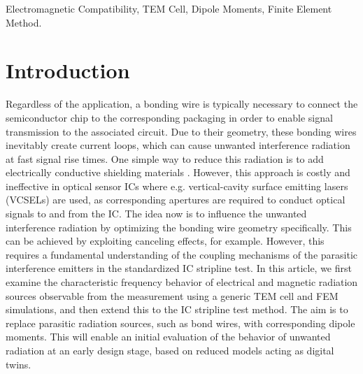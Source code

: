 \documentclass[conference]{IEEEtran}
\begin{document}
\begin{abstract}
The IC stripline test method is a standardized test method used to characterize the electromagnetic behavior of integrated circuits (ICs), particularly unwanted radiation behavior and sensitivity to external electromagnetic fields. This test method is based on the principle of TEM (transverse electromagnetic) cells. Due to the internal geometry of the IC's bond wires, parasitic electrically short electric and magnetic antennas emerge in the frequency range under consideration. In this contribution, the coupling behavior of these parasitic antennas to the IC stripline will be fundamentally investigated using the finite element method.
\end{abstract}

\begin{IEEEkeywords}
Electromagnetic Compatibility, TEM Cell, Dipole Moments, Finite Element Method.
\end{IEEEkeywords}

\section{Introduction}
Regardless of the application, a bonding wire is typically necessary to connect the semiconductor chip to the corresponding packaging in order to enable signal transmission to the associated circuit. Due to their geometry, these bonding wires inevitably create current loops, which can cause unwanted interference radiation at fast signal rise times. One simple way to reduce this radiation is to add electrically conductive shielding materials \cite{b1}. However, this approach is costly and ineffective in optical sensor ICs where e.g. vertical-cavity surface emitting lasers (VCSELs) \cite{b2} are used, as corresponding apertures are required to conduct optical signals to and from the IC. The idea now is to influence the unwanted interference radiation by optimizing the bonding wire geometry specifically. This can be achieved by exploiting canceling effects, for example. However, this requires a fundamental understanding of the coupling mechanisms of the parasitic interference emitters in the standardized IC stripline test. In this article, we first examine the characteristic frequency behavior of electrical and magnetic radiation sources observable from the measurement using a generic TEM cell \cite{b3} and FEM simulations, and then extend this to the IC stripline test method. The aim is to replace parasitic radiation sources, such as bond wires, with corresponding dipole moments. This will enable an initial evaluation of the behavior of unwanted radiation at an early design stage, based on reduced models acting as digital twins.
\end{document}
